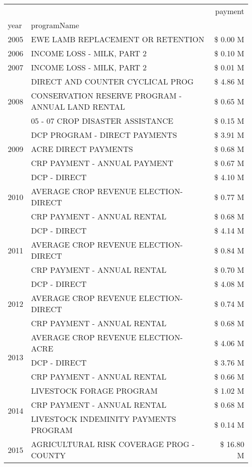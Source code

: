 \begin{tabular}{llr}
\toprule
 &  & payment \\
year & programName &  \\
\midrule
2005 & EWE LAMB REPLACEMENT OR RETENTION & \$ 0.00 M \\
\cline{1-3}
2006 & INCOME LOSS - MILK, PART 2 & \$ 0.10 M \\
\cline{1-3}
2007 & INCOME LOSS - MILK, PART 2 & \$ 0.01 M \\
\cline{1-3}
\multirow[t]{3}{*}{2008} & DIRECT AND COUNTER CYCLICAL PROG & \$ 4.86 M \\
 & CONSERVATION RESERVE PROGRAM - ANNUAL LAND RENTAL & \$ 0.65 M \\
 & 05 - 07 CROP DISASTER ASSISTANCE & \$ 0.15 M \\
\cline{1-3}
\multirow[t]{3}{*}{2009} & DCP PROGRAM - DIRECT PAYMENTS & \$ 3.91 M \\
 & ACRE DIRECT PAYMENTS & \$ 0.68 M \\
 & CRP PAYMENT - ANNUAL PAYMENT & \$ 0.67 M \\
\cline{1-3}
\multirow[t]{3}{*}{2010} & DCP - DIRECT & \$ 4.10 M \\
 & AVERAGE CROP REVENUE ELECTION-DIRECT & \$ 0.77 M \\
 & CRP PAYMENT - ANNUAL RENTAL & \$ 0.68 M \\
\cline{1-3}
\multirow[t]{3}{*}{2011} & DCP - DIRECT & \$ 4.14 M \\
 & AVERAGE CROP REVENUE ELECTION-DIRECT & \$ 0.84 M \\
 & CRP PAYMENT - ANNUAL RENTAL & \$ 0.70 M \\
\cline{1-3}
\multirow[t]{3}{*}{2012} & DCP - DIRECT & \$ 4.08 M \\
 & AVERAGE CROP REVENUE ELECTION-DIRECT & \$ 0.74 M \\
 & CRP PAYMENT - ANNUAL RENTAL & \$ 0.68 M \\
\cline{1-3}
\multirow[t]{3}{*}{2013} & AVERAGE CROP REVENUE ELECTION-ACRE & \$ 4.06 M \\
 & DCP - DIRECT & \$ 3.76 M \\
 & CRP PAYMENT - ANNUAL RENTAL & \$ 0.66 M \\
\cline{1-3}
\multirow[t]{3}{*}{2014} & LIVESTOCK FORAGE PROGRAM & \$ 1.02 M \\
 & CRP PAYMENT - ANNUAL RENTAL & \$ 0.68 M \\
 & LIVESTOCK INDEMINITY PAYMENTS PROGRAM & \$ 0.14 M \\
\cline{1-3}
\multirow[t]{3}{*}{2015} & AGRICULTURAL RISK COVERAGE PROG - COUNTY & \$ 16.80 M \\

\end{tabular}
